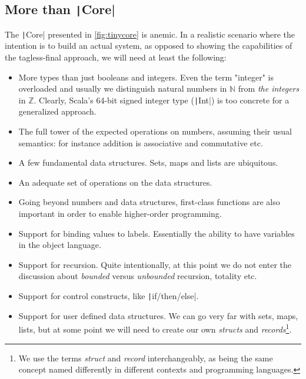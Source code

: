 \documentclass[11pt]{article}
\renewcommand{\vref}[1]{\autoref{#1} \vpageref{#1}}{}
\newcommand{\ScalaI}[1]{\texttt|#1|}
\newcommand{\TextI}[1]{\texttt|#1|}
\begin{document}
\subsection{More than \ScalaI{Core}}

The \ScalaI{Core} presented in \vref{fig:tinycore} is anemic. In a realistic 
scenario where the intention is to build an actual system, as opposed to 
showing the capabilities of the tagless-final approach, we will need at least 
the following:
\begin{itemize}
  \item More types than just booleans and integers. Even the term "integer" 
  is overloaded and usually we distinguish natural numbers in $\mathbb{N}$ 
  from \textit{the integers} in $\mathbb{Z}$. Clearly, Scala's 64-bit signed 
  integer type (\ScalaI{Int}) is too concrete for a generalized approach.
  
  \item The full tower of the expected operations on numbers, assuming their 
  usual semantics: for instance addition is associative and commutative etc.
  
  \item A few fundamental data structures. Sets, maps and lists are 
  ubiquitous.
  
  \item An adequate set of operations on the data structures.
  
  \item Going beyond numbers and data structures, first-class functions are 
  also important in order to enable higher-order programming.
  
  \item Support for binding values to labels. Essentially the ability to have 
  variables in the object language.
  
  \item Support for recursion. Quite intentionally, at this point we do not 
  enter the discussion about \textit{bounded} versus \textit{unbounded} 
  recursion, totality etc.
  
  \item Support for control constructs, like \TextI{if/then/else}.
  
  \item Support for user defined data structures. We can go very far with 
  sets, maps, lists, but at some point we will need to create our own 
  \textit{structs} and \textit{records}\footnote{We use the terms 
  \textit{struct} and \textit{record} interchangeably, as being the same 
  concept named differently in different contexts and programming 
  languages.}.
\end{itemize}
\end{document}
